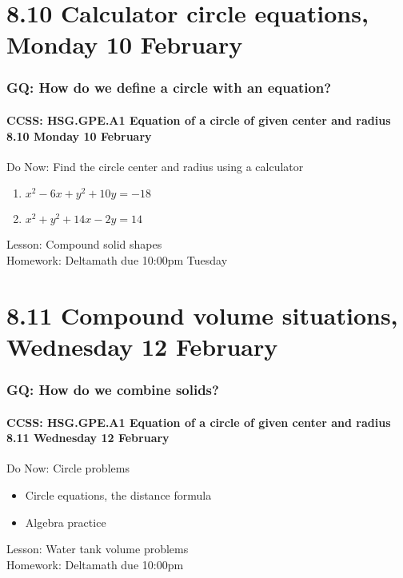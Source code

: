 \documentclass{beamer}
\begin{document}
\section{8.10 Calculator circle equations, Monday 10 February}
\frame
{
  \frametitle{GQ: How do we define a circle with an equation?}
  \framesubtitle{CCSS: HSG.GPE.A1 Equation of a circle of given center and radius \hfill \alert{8.10 Monday 10 February}}

  \begin{block}{Do Now: Find the circle center and radius using a calculator}
  \begin{enumerate}
    \item $x^2-6x+y^2+10y = -18$
    \item $x^2+y^2+14x-2y = 14$
  \end{enumerate}
  \end{block}
  Lesson: Compound solid shapes\\[5pt]
  Homework: Deltamath due 10:00pm Tuesday
}

\section{8.11 Compound volume situations, Wednesday 12 February}
\frame
{
  \frametitle{GQ: How do we combine solids?}
  \framesubtitle{CCSS: HSG.GPE.A1 Equation of a circle of given center and radius \hfill \alert{8.11 Wednesday 12 February}}

  \begin{block}{Do Now: Circle problems}
  \begin{itemize}
    \item Circle equations, the distance formula
    \item Algebra practice
  \end{itemize}
  \end{block}
  Lesson: Water tank volume problems\\[5pt]
  Homework: Deltamath due 10:00pm
}
\end{document}
